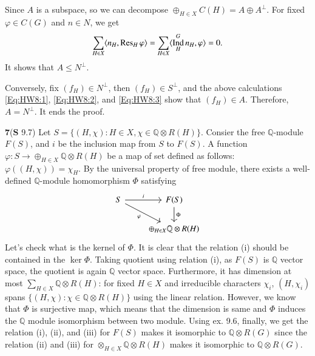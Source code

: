 \documentclass[a4paper, 12pt]{article}
\theoremstyle{Mydefinition}
\theoremstyle{Mytheorem}
\DeclareMathOperator{\Ind}{Ind}
\begin{document}
\begin{enumerate}
    Since $A$ is a subspace, so we can decompose $\oplus_{H\in X}C(H) = A\oplus A^\perp$. For fixed $\varphi\in C(G)$ and $n\in N$, we get
    \begin{equation}
        \sum_{H\in X}\langle n_H, \Res_H \varphi \rangle =\sum_{H\in X}\langle \Ind_H^G n_H, \varphi \rangle = 0.
    \end{equation}
    It shows that $A\leq N^\perp$.
    
    Conversely, fix $(f_H)\in N^\perp$, then $(f_H)\in S^\perp$, and the above calculations \eqref{Eq:HW8:1}, \eqref{Eq:HW8:2}, and \eqref{Eq:HW8:3} show that $(f_H)\in A$. Therefore, $A= N^\perp$. It ends the proof.
\end{enumerate}

\noindent \textbf{7}(\textbf{S} 9.7)
Let $S = \{(H,\chi):H\in X,\chi\in \mathbb{Q}\otimes R(H)\}$. Consier the free $\mathbb{Q}$-module $F(S)$, and $i$ be the inclusion map from $S$ to $F(S)$. A function $\varphi:S\rightarrow \oplus_{H\in X} \mathbb{Q}\otimes R(H)$ be a map of set defined as follows: $\varphi((H, \chi)) = \chi_H$. By the universal property of free module, there exists a well-defined $\mathbb{Q}$-module homomorphism $\Phi$ satisfying
\[
  \begin{tikzcd}
    S \arrow{r}{i} \arrow[swap]{dr}{\varphi} & F(S) \arrow{d}{\Phi} \\
     & \oplus_{H\in X} \mathbb{Q}\otimes R(H)
  \end{tikzcd}
\]
Let's check what is the kernel of $\Phi$. It is clear that the relation (i) should be contained in the $\ker \Phi$. Taking quotient using relation (i), as $F(S)$ is $\mathbb{Q}$ vector space, the quotient is again $\mathbb{Q}$ vector space. Furthermore, it has dimension at most $\sum_{H\in X}\mathbb{Q}\otimes R(H)$: for fixed $H\in X$ and irreducible characters $\chi_i$, $(H,\chi_i)$ spans $\{(H,\chi):\chi\in\mathbb{Q}\otimes R(H)\}$ using the linear relation. However, we know that $\Phi$ is surjective map, which means that the dimension is same and $\Phi$ induces the $\mathbb{Q}$ module isomorphism between two module. Using ex. 9.6, finally, we get the relation (i), (ii), and (iii) for $F(S)$ makes it isomorphic to $\mathbb{Q}\otimes R(G)$ since the relation (ii) and (iii) for $\otimes_{H\in X}\mathbb{Q}\otimes R(H)$ makes it isomorphic to $\mathbb{Q}\otimes R(G)$.\\
\end{document}
